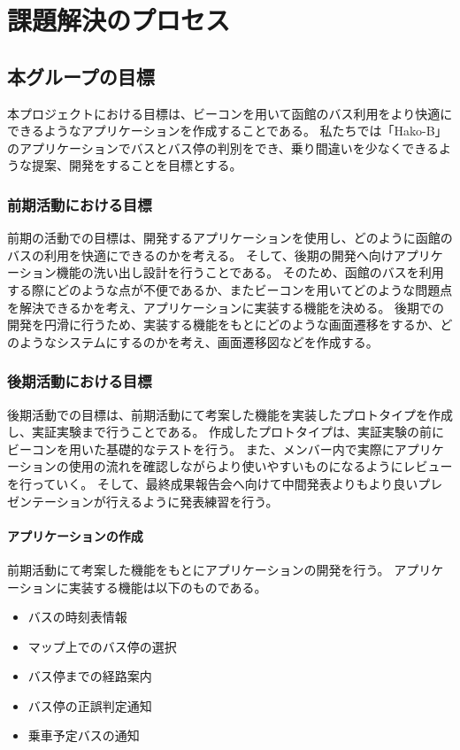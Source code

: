 \documentclass[openany,11pt,papersize]{jsbook}
\begin{document}
\chapter{課題解決のプロセス}
\section{本グループの目標}
本プロジェクトにおける目標は、ビーコンを用いて函館のバス利用をより快適にできるようなアプリケーションを作成することである。
私たちでは「Hako-B」のアプリケーションでバスとバス停の判別をでき、乗り間違いを少なくできるような提案、開発をすることを目標とする。


\subsection{前期活動における目標}
前期の活動での目標は、開発するアプリケーションを使用し、どのように函館のバスの利用を快適にできるのかを考える。
そして、後期の開発へ向けアプリケーション機能の洗い出し設計を行うことである。
そのため、函館のバスを利用する際にどのような点が不便であるか、またビーコンを用いてどのような問題点を解決できるかを考え、アプリケーションに実装する機能を決める。
後期での開発を円滑に行うため、実装する機能をもとにどのような画面遷移をするか、どのようなシステムにするのかを考え、画面遷移図などを作成する。


\subsection{後期活動における目標}
後期活動での目標は、前期活動にて考案した機能を実装したプロトタイプを作成し、実証実験まで行うことである。
作成したプロトタイプは、実証実験の前にビーコンを用いた基礎的なテストを行う。
また、メンバー内で実際にアプリケーションの使用の流れを確認しながらより使いやすいものになるようにレビューを行っていく。
そして、最終成果報告会へ向けて中間発表よりもより良いプレゼンテーションが行えるように発表練習を行う。


\subsubsection{アプリケーションの作成}
前期活動にて考案した機能をもとにアプリケーションの開発を行う。
アプリケーションに実装する機能は以下のものである。
\begin{itemize}

\item バスの時刻表情報
\item マップ上でのバス停の選択
\item バス停までの経路案内
\item バス停の正誤判定通知
\item 乗車予定バスの通知

\end{itemize}
\end{document}
